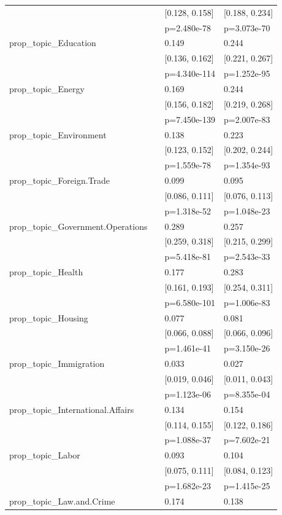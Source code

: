 \begin{tabular}{llll}
&  & [0.128, 0.158] & [0.188, 0.234] \\
&  & p=2.480e-78 & p=3.073e-70 \\
prop_topic_Education &  & 0.149 & 0.244 \\
&  & [0.136, 0.162] & [0.221, 0.267] \\
&  & p=4.340e-114 & p=1.252e-95 \\
prop_topic_Energy &  & 0.169 & 0.244 \\
&  & [0.156, 0.182] & [0.219, 0.268] \\
&  & p=7.450e-139 & p=2.007e-83 \\
prop_topic_Environment &  & 0.138 & 0.223 \\
&  & [0.123, 0.152] & [0.202, 0.244] \\
&  & p=1.559e-78 & p=1.354e-93 \\
prop_topic_Foreign.Trade &  & 0.099 & 0.095 \\
&  & [0.086, 0.111] & [0.076, 0.113] \\
&  & p=1.318e-52 & p=1.048e-23 \\
prop_topic_Government.Operations &  & 0.289 & 0.257 \\
&  & [0.259, 0.318] & [0.215, 0.299] \\
&  & p=5.418e-81 & p=2.543e-33 \\
prop_topic_Health &  & 0.177 & 0.283 \\
&  & [0.161, 0.193] & [0.254, 0.311] \\
&  & p=6.580e-101 & p=1.006e-83 \\
prop_topic_Housing &  & 0.077 & 0.081 \\
&  & [0.066, 0.088] & [0.066, 0.096] \\
&  & p=1.461e-41 & p=3.150e-26 \\
prop_topic_Immigration &  & 0.033 & 0.027 \\
&  & [0.019, 0.046] & [0.011, 0.043] \\
&  & p=1.123e-06 & p=8.355e-04 \\
prop_topic_International.Affairs &  & 0.134 & 0.154 \\
&  & [0.114, 0.155] & [0.122, 0.186] \\
&  & p=1.088e-37 & p=7.602e-21 \\
prop_topic_Labor &  & 0.093 & 0.104 \\
&  & [0.075, 0.111] & [0.084, 0.123] \\
&  & p=1.682e-23 & p=1.415e-25 \\
prop_topic_Law.and.Crime &  & 0.174 & 0.138 \\

\end{tabular}
